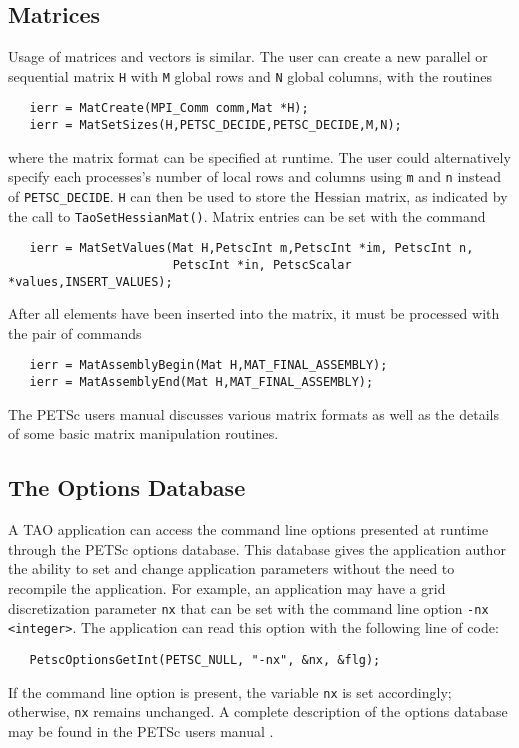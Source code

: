 \subsection*{Matrices}

Usage of matrices and vectors is similar.  
The user can create a new parallel or sequential matrix \texttt{H} with 
\texttt{M} global rows and \texttt{N} global columns, with the routines

\begin{verbatim}
   ierr = MatCreate(MPI_Comm comm,Mat *H);
   ierr = MatSetSizes(H,PETSC_DECIDE,PETSC_DECIDE,M,N);
\end{verbatim}
\noindent
where the matrix format can be specified at runtime.  The user could
alternatively specify each processes's number of local rows and columns
using \texttt{m} and \texttt{n} instead of \texttt{PETSC\_DECIDE}.  
\texttt{H} can then be used to store
the Hessian matrix, as indicated by the call to
\texttt{TaoSetHessianMat()}.  Matrix entries can be set with the
command
\begin{verbatim}
   ierr = MatSetValues(Mat H,PetscInt m,PetscInt *im, PetscInt n,
                       PetscInt *in, PetscScalar *values,INSERT_VALUES);
\end{verbatim}
\noindent
After %
all elements have been inserted into the
matrix, it must be processed with the pair of commands

\begin{verbatim}
   ierr = MatAssemblyBegin(Mat H,MAT_FINAL_ASSEMBLY);
   ierr = MatAssemblyEnd(Mat H,MAT_FINAL_ASSEMBLY);
\end{verbatim}
\noindent
The PETSc users manual \cite{petsc-user-ref} discusses
various matrix formats as
well as the details of some basic matrix manipulation routines.


\subsection*{The Options Database}
\label{sec:options}
A TAO application can access the command line options presented at
runtime through the PETSc options database. This database gives the application
author the ability to set and change application parameters without
the need to recompile the application. For example, 
an application may have a grid discretization parameter \texttt{nx}
that can be set with the command line option \texttt{-nx <integer>}.
The application can read this option with the following line of code:
\begin{verbatim}
   PetscOptionsGetInt(PETSC_NULL, "-nx", &nx, &flg);
\end{verbatim}
\noindent
If the command line option is present, the variable \texttt{nx} is set
accordingly; otherwise, \texttt{nx} remains unchanged. A complete
description of the options database may be found in the PETSc users
manual \cite{petsc-user-ref}.

